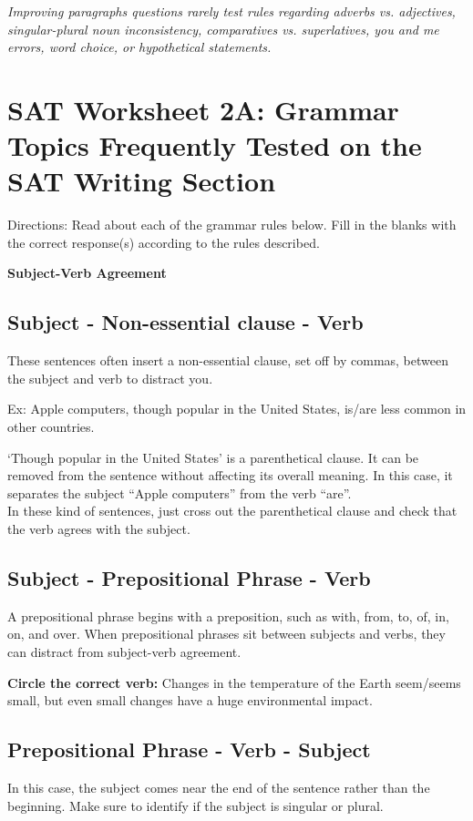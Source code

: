 \begin{center}
\bigskip
\textit{Improving paragraphs questions rarely test rules regarding adverbs vs. adjectives, singular-plural noun inconsistency, comparatives vs. superlatives, you and me errors, word choice, or hypothetical statements.}

\end{center}

\bigskip

\bigskip

\section[Grammar Topics]{SAT Worksheet 2A: Grammar Topics Frequently Tested on the SAT Writing Section}
Directions: Read about each of the grammar rules below. Fill in the blanks with the correct response(s) according to the rules described.


\bigskip
\textbf{\large Subject-Verb Agreement}


\subsection{Subject - Non-essential clause - Verb}
These sentences often insert a non-essential clause, set off by commas, between the subject and verb to distract you.

\bigskip
Ex: Apple computers, though popular in the United States, is/are less common in other countries.

\bigskip
‘Though popular in the United States' is a parenthetical clause.  It can be removed from the sentence without affecting its overall meaning.  In this case, it separates the subject “Apple computers” from the verb “are”.\\
In these kind of sentences, just cross out the parenthetical clause and check that the verb agrees with the subject.

\subsection{Subject - Prepositional Phrase - Verb}
A prepositional phrase begins with a preposition, such as with, from, to, of, in, on, and over.  When prepositional phrases sit between subjects and verbs, they can distract from subject-verb agreement.

\bigskip
\textbf{Circle the correct verb:} 
Changes in the temperature of the Earth seem/seems small, but even small changes have a huge environmental impact.


\subsection{Prepositional Phrase - Verb - Subject}
In this case, the subject comes near the end of the sentence rather than the beginning. Make sure to identify if the subject is singular or plural.



